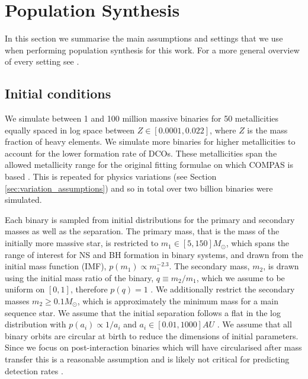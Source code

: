 \section{Population Synthesis}\label{app:pop_synth}

In this section we summarise the main assumptions and settings that we use when performing population synthesis for this work. For a more general overview of every setting see \citet{Broekgaarden+2021}.

\subsection{Initial conditions}

We simulate between 1 and 100 million massive binaries for 50 metallicities equally spaced in log space between $Z \in [0.0001, 0.022]$, where $Z$ is the mass fraction of heavy elements. We simulate more binaries for higher metallicities to account for the lower formation rate of DCOs. These metallicities span the allowed metallicity range for the original fitting formulae on which COMPAS is based \citep{Hurley+2000}. This is repeated for \nMinusOneModels{} physics variations (see Section \ref{sec:variation_assumptions}) and so in total over two billion binaries were simulated.

Each binary is sampled from initial distributions for the primary and secondary masses as well as the separation. The primary mass, that is the mass of the initially more massive star, is restricted to $m_1 \in [5, 150] \unit{M_{\odot}}$, which spans the range of interest for NS and BH formation in binary systems, and drawn from the \citet{Kroupa+2001} initial mass function (IMF), $p(m_1) \propto m_1^{-2.3}$. The secondary mass, $m_2$, is drawn using the initial mass ratio of the binary, $q \equiv m_2 / m_1$, which we assume to be uniform on $[0, 1]$, therefore $p(q) = 1$ \citep[consistent e.g.\ with][]{Sana+2012}. We additionally restrict the secondary masses $m_2 \ge 0.1 \unit{M_{\odot}}$, which is approximately the minimum mass for a main sequence star. We assume that the initial separation follows a flat in the log distribution with $p(a_i) \propto 1 / a_i$ and $a_i \in [0.01, 1000] \unit{AU}$ \citep{Opik+1924, Abt+1983}. We assume that all binary orbits are circular at birth to reduce the dimensions of initial parameters. Since we focus on post-interaction binaries which will have circularised after mass transfer this is a reasonable assumption and is likely not critical for predicting detection rates \citep{Hurley+2002, deMink+2015}.

